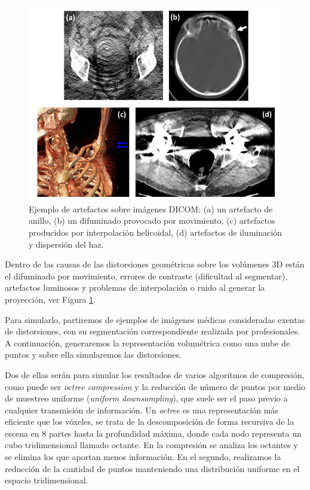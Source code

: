 \begin{figure}[htp]
  \centering 
  \includegraphics[width=\textwidth]{imagenes/chapter2/DicomDistortionsExample.png}
  \caption[Ejemplo de artefactos sobre imágenes DICOM.]{Ejemplo de artefactos sobre imágenes DICOM\cite{DicomDistortionsExample}: 
  (a) un artefacto de anillo, (b) un difuminado provocado por movimiento, 
  (c) artefactos producidos por interpolación helicoidal, (d) artefactos de iluminación y dispersión del haz.  }
  \label{fig:DicomDistortionsExample}
\end{figure}

Dentro de las causas de las distorsiones geométricas sobre los volúmenes 
3D están el difuminado por movimiento, errores de contraste (dificultad al segmentar),
artefactos luminosos y problemas de interpolación o ruido al generar la proyección, ver Figura \ref{fig:DicomDistortionsExample}. 

Para simularlo, partiremos de ejemplos de imágenes médicas consideradas exentas de 
distorsiones, con su segmentación correspondiente realizada por profesionales.
A continuación, generaremos la representación volumétrica como una nube de puntos 
y sobre ella simularemos las distorsiones. 

Dos de ellas serán para simular los resultados de varios algoritmos de compresión, 
como puede ser \emph{octree compression}\cite{OctreeCompression} y la reducción de número de puntos 
por medio de muestreo uniforme (\emph{uniform downsampling}), que suele ser el paso 
previo a cualquier transmisión de información. 
Un \emph{octree} es una representación más eficiente que los vóxeles, se trata 
de la descomposición de forma recursiva de la escena en 8 partes hasta 
la profundidad máxima, donde cada nodo representa un cubo tridimensional 
llamado octante. En la compresión se analiza los octantes y se elimina los que aportan 
menos información. 
En el segundo, realizamos la reducción de la cantidad de puntos manteniendo 
una distribución uniforme en el espacio tridimensional.


